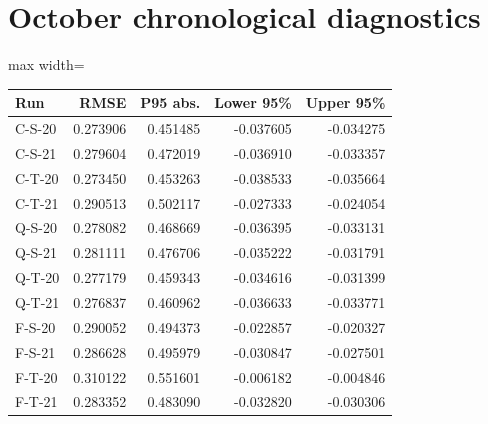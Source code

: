 \documentclass[11pt,oneside,openany]{book}
\begin{document}
\section*{October chronological diagnostics}
\begin{center}\footnotesize\sffamily\setlength{\tabcolsep}{3.5pt}\renewcommand{\arraystretch}{1.2}
\begin{adjustbox}{max width=\linewidth}\begin{tabular}{@{}lrrrr@{}}\toprule
Run & RMSE & P95 abs. & Lower 95\% & Upper 95\% \\ \midrule
C-S-20 & 0.273906 & 0.451485 & -0.037605 & -0.034275 \\
C-S-21 & 0.279604 & 0.472019 & -0.036910 & -0.033357 \\
C-T-20 & 0.273450 & 0.453263 & -0.038533 & -0.035664 \\
C-T-21 & 0.290513 & 0.502117 & -0.027333 & -0.024054 \\
Q-S-20 & 0.278082 & 0.468669 & -0.036395 & -0.033131 \\
Q-S-21 & 0.281111 & 0.476706 & -0.035222 & -0.031791 \\
Q-T-20 & 0.277179 & 0.459343 & -0.034616 & -0.031399 \\
Q-T-21 & 0.276837 & 0.460962 & -0.036633 & -0.033771 \\
F-S-20 & 0.290052 & 0.494373 & -0.022857 & -0.020327 \\
F-S-21 & 0.286628 & 0.495979 & -0.030847 & -0.027501 \\
F-T-20 & 0.310122 & 0.551601 & -0.006182 & -0.004846 \\
F-T-21 & 0.283352 & 0.483090 & -0.032820 & -0.030306 \\
\bottomrule\end{tabular}\end{adjustbox}\end{center}
\end{document}
